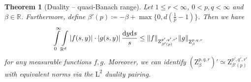 \documentclass[10pt,a4paper]{amsart}
\newtheorem{theorem}{Theorem}
\newcommand{\IR}{\mathbb{R}}
\renewcommand{\L}{\mathrm{L}}
\newcommand{\Z}{\mathrm{Z}}
\renewcommand{\d}{\mathrm{d}}
\begin{document}
\begin{theorem}[Duality -- quasi-Banach range]
\label{thm: duality full range}
    Let $1\leq r <\infty$, $0<p,q<\infty$ and $\beta\in \IR$. Furthermore, define $\beta'(p)\coloneqq -\beta+\max\{0,d(\frac{1}{p}-1)\}$.
    Then we have
    \begin{align*}
        \int\limits_0^\infty \int\limits_{\IR^d} |f(s,y)| \cdot |g(s,y)| \,\frac{\d y \d s}{s} \leq  \|f\|_{\Z^{p',q',r'}_{\beta'(p)} }\|g\|_{\Z^{\vphantom{p',q',r'}p,q,r}_{\beta} }
    \end{align*}
    for any measurable functions $f,g$. Moreover, we can identify $(\Z^{p,q,r}_\beta)' \simeq \Z^{p',q',r'}_{\beta'(p)}$ with equivalent norms via the $\L^2$ duality pairing.

\end{theorem}
\end{document}

